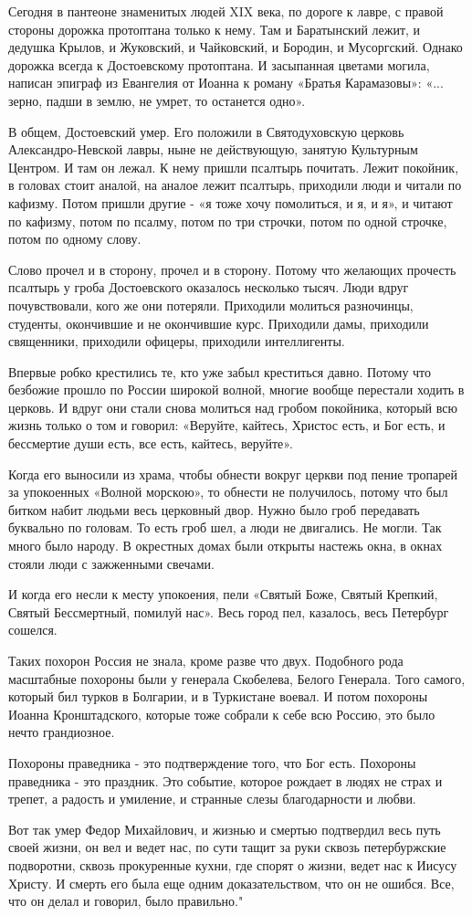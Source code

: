 Сегодня в пантеоне знаменитых людей XIX века, по дороге к лавре, с правой
стороны дорожка протоптана только к нему. Там и Баратынский лежит, и дедушка
Крылов, и Жуковский, и Чайковский, и Бородин, и Мусоргский. Однако дорожка
всегда к Достоевскому протоптана. И засыпанная цветами могила, написан эпиграф
из Евангелия от Иоанна к роману «Братья Карамазовы»: «... зерно, падши в землю,
не умрет, то останется одно».

В общем, Достоевский умер. Его положили в Святодуховскую церковь
Александро-Невской лавры, ныне не действующую, занятую Культурным Центром. И
там он лежал. К нему пришли псалтырь почитать. Лежит покойник, в головах стоит
аналой, на аналое лежит псалтырь, приходили люди и читали по кафизму. Потом
пришли другие - «я тоже хочу помолиться, и я, и я», и читают по кафизму, потом
по псалму, потом по три строчки, потом по одной строчке, потом по одному слову.

Слово прочел и в сторону, прочел и в сторону. Потому что желающих прочесть
псалтырь у гроба Достоевского оказалось несколько тысяч. Люди вдруг
почувствовали, кого же они потеряли. Приходили молиться разночинцы, студенты,
окончившие и не окончившие курс. Приходили дамы, приходили священники,
приходили офицеры, приходили интеллигенты.

Впервые робко крестились те, кто уже забыл креститься давно. Потому что
безбожие прошло по России широкой волной, многие вообще перестали ходить в
церковь. И вдруг они стали снова молиться над гробом покойника, который всю
жизнь только о том и говорил: «Веруйте, кайтесь, Христос есть, и Бог есть, и
бессмертие души есть, все есть, кайтесь, веруйте».

Когда его выносили из храма, чтобы обнести вокруг церкви под пение тропарей за
упокоенных «Волной морскою», то обнести не получилось, потому что был битком
набит людьми весь церковный двор. Нужно было гроб передавать буквально по
головам. То есть гроб шел, а люди не двигались. Не могли. Так много было
народу. В окрестных домах были открыты настежь окна, в окнах стояли люди с
зажженными свечами.

И когда его несли к месту упокоения, пели «Святый Боже, Святый Крепкий, Святый
Бессмертный, помилуй нас». Весь город пел, казалось, весь Петербург сошелся.

Таких похорон Россия не знала, кроме разве что двух. Подобного рода масштабные
похороны были у генерала Скобелева, Белого Генерала. Того самого, который бил
турков в Болгарии, и в Туркистане воевал. И потом похороны Иоанна
Кронштадского, которые тоже собрали к себе всю Россию, это было нечто
грандиозное.

Похороны праведника - это подтверждение того, что Бог есть. Похороны праведника
- это праздник. Это событие, которое  рождает в людях не страх и трепет, а
радость и умиление, и странные слезы благодарности и любви.

Вот так умер Федор Михайлович, и жизнью и смертью подтвердил весь путь своей
жизни, он вел и ведет нас, по сути тащит за руки сквозь петербуржские
подворотни, сквозь прокуренные кухни, где спорят о жизни, ведет нас к Иисусу
Христу. И смерть его была еще одним доказательством, что он не ошибся. Все, что
он делал и говорил, было правильно."

